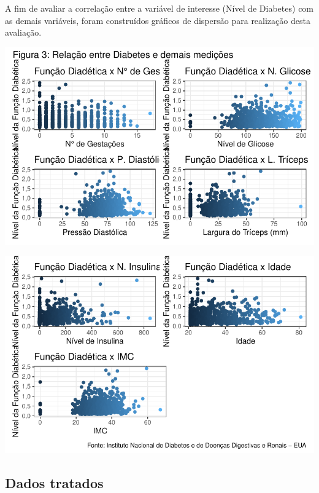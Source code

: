 \documentclass[
  twocolumn,
  landscape]{report}
\begin{document}
A fim de avaliar a correlação entre a variável de interesse (Nível de
Diabetes) com as demais variáveis, foram construídos gráficos de
dispersão para realização desta avaliação.

\includegraphics{relatorio_lab1_files/figure-pdf/unnamed-chunk-6-1.pdf}

\includegraphics{relatorio_lab1_files/figure-pdf/unnamed-chunk-6-2.pdf}

\subsection{Dados tratados}
\end{document}
